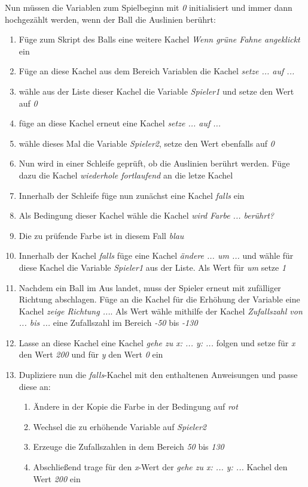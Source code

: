 Nun müssen die Variablen zum Spielbeginn mit \emph{0} initialisiert und immer dann hochgezählt werden, wenn der Ball die Auslinien berührt: 
\begin{enumerate}\addtocounter{enumi}{5}
\item Füge zum Skript des Balls eine weitere Kachel \textit{Wenn grüne Fahne angeklickt} ein
\item Füge an diese Kachel aus dem Bereich Variablen die Kachel \textit{setze ... auf ...} 
\item wähle aus der Liste dieser Kachel die Variable \textit{Spieler1}  und setze den Wert auf \emph{0}
\item füge an diese Kachel erneut eine Kachel \textit{setze ... auf ...} 
\item wähle dieses Mal die Variable \textit{Spieler2},  setze den Wert ebenfalls auf \emph{0}
\item Nun wird in einer Schleife geprüft, ob die Auslinien berührt werden. Füge dazu die Kachel \textit{wiederhole fortlaufend} an die letze Kachel
\item Innerhalb der Schleife füge nun  zunächst eine Kachel \textit{falls} ein
\item Als Bedingung dieser Kachel wähle die Kachel \textit{wird Farbe ... berührt?} 
\item Die zu prüfende Farbe ist in diesem Fall \textit{blau}
\item Innerhalb der Kachel \textit{falls} füge eine Kachel \textit{ändere ... um ...} und wähle für diese Kachel die Variable \textit{Spieler1} aus der Liste. Als Wert für \emph{um} setze \emph{1} 
\item Nachdem ein Ball im Aus landet, muss der Spieler erneut mit zufälliger Richtung abschlagen. Füge an die Kachel für die Erhöhung der Variable eine Kachel \textit{zeige Richtung ...}. Als Wert wähle mithilfe der Kachel \textit{Zufallszahl von ... bis ...}  eine Zufallszahl im Bereich \emph{-50} bis \emph{-130}
\item Lasse an diese Kachel eine Kachel \textit{gehe zu x: ... y: ...} folgen und setze für \emph{x} den Wert \emph{200} und für \emph{y} den Wert \emph{0} ein
\item Dupliziere nun die \textit{falls}-Kachel mit den enthaltenen Anweisungen und passe diese an:
\begin{enumerate}
\item Ändere in der Kopie die Farbe in der Bedingung auf \emph{rot}
\item Wechsel die zu erhöhende Variable auf \textit{Spieler2}
\item Erzeuge die Zufallszahlen in dem Bereich \emph{50} bis \emph{130}
\item Abschließend trage für den \emph{x}-Wert der \textit{gehe zu x: ... y: ...} Kachel den Wert \emph{200} ein
\end{enumerate}
\end{enumerate}



